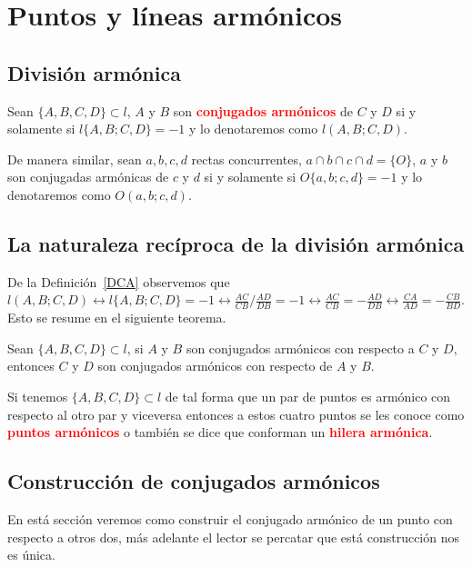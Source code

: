 \chapter{Puntos y líneas armónicos}

\section{División armónica}
\begin{df}\label{DCA}
Sean $\{A,B,C,D\}\subset l$, $A$ y $B$ son \textcolor{red}{\bf conjugados armónicos} de $C$ y $D$ si y solamente si $l\{A,B;C,D\}=-1$ y lo  denotaremos como $l(A,B;C,D)$.

De manera similar, sean $a,b,c,d$ rectas concurrentes, $a\cap b\cap c\cap d=\{O\}$, $a$ y $b$ son conjugadas armónicas de $c$ y $d$ si y solamente si $O\{a,b;c,d\}=-1$ y lo denotaremos como $O(a,b;c,d)$.
\end{df}
\section{La naturaleza recíproca de la división armónica}
De la Definición~\ref{DCA} observemos que
$l(A,B;C,D)\leftrightarrow l\{A,B;C,D\}=-1\leftrightarrow \frac{AC}{CB}\Big/\frac{AD}{DB}=-1\leftrightarrow \frac{AC}{CB}=-\frac{AD}{DB}\leftrightarrow\frac{CA}{AD}=-\frac{CB}{BD}$. Esto se resume en el siguiente teorema.

\begin{teo}\label{THA}
Sean $\{A,B,C,D\}\subset l$, si $A$ y $B$ son conjugados armónicos con respecto a $C$ y $D$, entonces $C$ y $D$ son conjugados armónicos con respecto de $A$ y $B$. 
\end{teo}

Si tenemos $\{A,B,C,D\}\subset l$ de tal forma que un par de puntos es armónico con respecto al otro par y viceversa entonces a estos cuatro puntos se les conoce como \textcolor{red}{\bf puntos armónicos} o también se dice que conforman un \textcolor{red}{\bf hilera armónica}.

\section{Construcción de conjugados armónicos}
En está sección veremos como construir el conjugado armónico de un punto con respecto a otros dos, más adelante el lector se percatar que está construcción nos es única.

